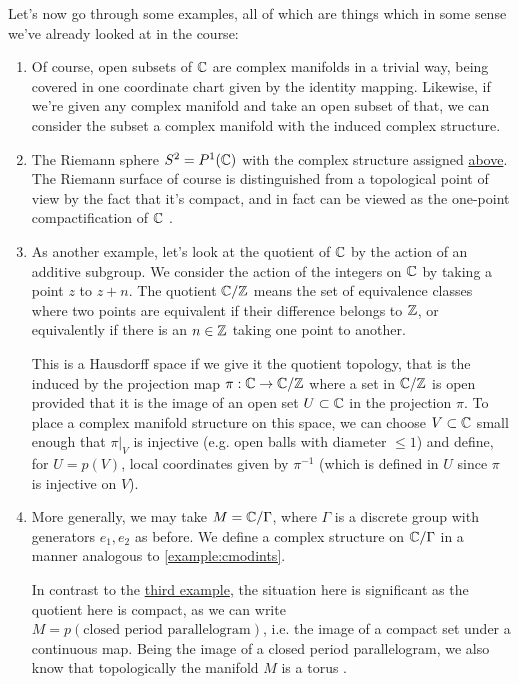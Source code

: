 \documentclass{article}
\begin{document}
Let's now go through some examples, all of which are things which in some sense we've already looked at in the course:
\begin{enumerate}

  \item Of course, open subsets of \(\mathbb{C}\) are complex manifolds in a trivial way, being covered in one coordinate chart given by the identity mapping. Likewise, if we're given any complex manifold and take an open subset of that, we can consider the subset a complex manifold with the induced complex structure.

  \item The Riemann sphere \(S^2 = P^1(\mathbb{C})\) with the complex structure assigned \hyperref[example:riemann_complex_structure]{above}. The Riemann surface of course is distinguished from a topological point of view by the fact that it's compact, and in fact can be viewed as the one-point compactification of \(\mathbb{C}\) \label{example:riemann_complex_manifold}.

  \item As another example, let's look at the quotient of \(\mathbb{C}\) by the action of an additive subgroup. We consider the action of the integers on \(\mathbb{C}\) by taking a point \(z\) to \(z + n\). The quotient \(\mathbb{C}/\mathbb{Z}\) means the set of equivalence classes where two points are equivalent if their difference belongs to \(\mathbb{Z}\), or equivalently if there is an \(n \in \mathbb{Z}\) taking one point to another.

  This is a Hausdorff space if we give it the quotient topology, that is the induced by the projection map \(\pi: \mathbb{C} \to \mathbb{C}/\mathbb{Z}\) where a set in \(\mathbb{C}/\mathbb{Z}\) is open provided that it is the image of an open set \(U \subset \mathbb{C}\) in the projection \(\pi\). To place a complex manifold structure on this space, we can choose \(V \subset \mathbb{C}\) small enough that \(\pi|_V\) is injective (e.g. open balls with diameter \(\leq 1\)) and define, for \(U = p(V)\), local coordinates given by \(\pi^{-1}\) (which is defined in \(U\) since \(\pi\) is injective on \(V\)).
  \label{example:cmodints}

  \item More generally, we may take \(M = \mathbb{C}/\Gamma\), where \(\Gamma\) is a discrete group with generators \(e_1, e_2\) as before. We define a complex structure on \(\mathbb{C}/\Gamma\) in a manner analogous to \ref{example:cmodints}.

  In contrast to the \hyperref[example:cmodints]{third example}, the situation here is significant as the quotient here is compact, as we can write \(M = p(\text{closed period parallelogram})\), i.e. the image of a compact set under a continuous map. Being the image of a closed period parallelogram, we also know that topologically the manifold \(M\) is a torus \label{example:torus_complex_manifold}.

\end{enumerate}
\end{document}
